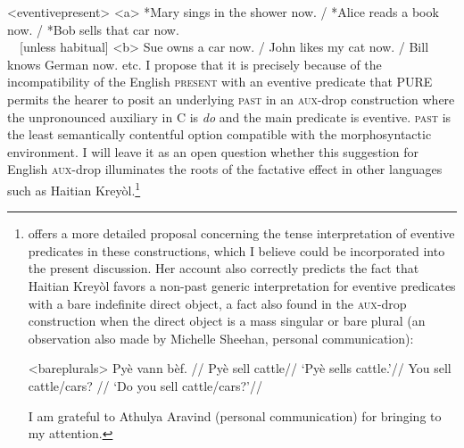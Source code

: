 \documentclass[output=paper]{langscibook}
\begin{document}
\pex<eventivepresent>
\a<a> *Mary sings in the shower now. / *Alice reads a book now. / *Bob sells that car now.\\	~~[unless habitual]
\a<b> Sue owns a car now. / John likes my cat now. / Bill knows German now. etc.
\xe
\noindent I propose that it is precisely because of the incompatibility of the English \textsc{present} with an eventive predicate that PURE permits the hearer to posit an underlying \textsc{past} in an \textsc{aux-}drop construction where the unpronounced auxiliary in C is \textit{do} and the main predicate is eventive. \textsc{past} is the least semantically contentful option compatible with the morphosyntactic environment. I will leave it as an open question whether this suggestion for English \textsc{aux}-drop illuminates the roots of the factative effect in other languages such as Haitian Kreyòl.{\footnote{\citet{Dechaine:1995} offers a more detailed proposal concerning the tense interpretation of eventive predicates in these constructions, which I believe could be incorporated into the present discussion. Her account also correctly predicts the fact that Haitian Kreyòl favors a non-past generic interpretation for eventive predicates with a bare indefinite direct object, a fact also found in the \textsc{aux}-drop construction when the direct object is a mass singular or bare plural (an observation also made by Michelle Sheehan, personal communication):

\pexcnn<bareplurals>
\a
\begingl
\gla Pyè vann bèf. {}//
\glb Pyè sell cattle//
\glft `Pyè sells cattle.'//
\endgl
\a
\begingl
\gla You sell cattle/cars? //
\glft `Do you sell cattle/cars?'//
\endgl
\xe

\noindent I am grateful to Athulya Aravind (personal communication) for bringing \citet{Dechaine:1995} to my attention.}}
\end{document}
